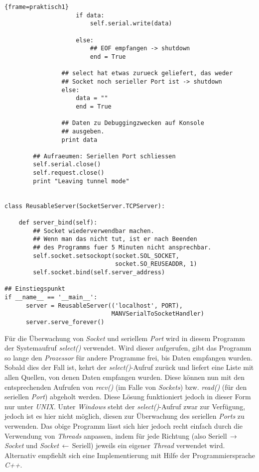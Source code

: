 \begin{lstlisting}{frame=praktisch1}
                    if data:
                        self.serial.write(data)

                    else:
                        ## EOF empfangen -> shutdown
                        end = True

                ## select hat etwas zurueck geliefert, das weder 
                ## Socket noch serieller Port ist -> shutdown
                else:
                    data = ""
                    end = True

                ## Daten zu Debuggingzwecken auf Konsole 
                ## ausgeben.
                print data

        ## Aufraeumen: Seriellen Port schliessen 
        self.serial.close()
        self.request.close()
        print "Leaving tunnel mode"


class ReusableServer(SocketServer.TCPServer):

    def server_bind(self):
        ## Socket wiederverwendbar machen.
        ## Wenn man das nicht tut, ist er nach Beenden 
        ## des Programms fuer 5 Minuten nicht ansprechbar.
        self.socket.setsockopt(socket.SOL_SOCKET,
                               socket.SO_REUSEADDR, 1)
        self.socket.bind(self.server_address)

## Einstiegspunkt 
if __name__ == '__main__':
      server = ReusableServer(('localhost', PORT), 
                              MANVSerialToSocketHandler)
      server.serve_forever()
\end{lstlisting}

Für die Überwachung von \emph{Socket} und seriellem \emph{Port} wird in diesem Programm der Systemaufruf
\emph{select()} verwendet. Wird dieser aufgerufen, gibt das Programm so lange den \emph{Prozessor}
für andere Programme frei, bis Daten empfangen wurden. Sobald dies der Fall ist, kehrt
der \emph{select()}-Aufruf zurück und liefert eine Liste mit allen Quellen, von denen Daten
empfangen wurden. Diese können nun mit den entsprechenden Aufrufen von \emph{recv()} 
(im Falle von \emph{Sockets}) bzw. \emph{read()} (für den seriellen \emph{Port}) abgeholt werden.
Diese Lösung funktioniert jedoch in dieser Form nur unter \emph{UNIX}. Unter \emph{Windows} steht der 
\emph{select()}-Aufruf zwar zur Verfügung, jedoch ist es hier nicht möglich, diesen zur
Überwachung des seriellen \emph{Ports} zu verwenden. Das obige Programm lässt sich hier jedoch
recht einfach durch die Verwendung von \emph{Threads} anpassen, indem für jede Richtung (also
Seriell$\,\rightarrow{}\,$\emph{Socket} und \emph{Socket}$\,\leftarrow{}\,$Seriell) jeweils ein eigener \emph{Thread} verwendet
wird. Alternativ empfiehlt sich eine Implementierung mit Hilfe der Programmiersprache \emph{C++}.

